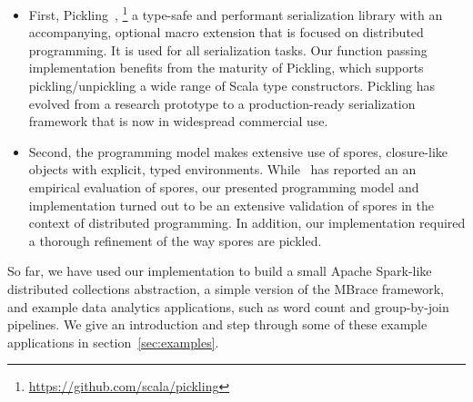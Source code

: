 \documentclass{jfp1}
\begin{document}
\begin{itemize}

  \item First, Pickling~\cite{Pickling},
    \footnote{\url{https://github.com/scala/pickling}} a type-safe and
    performant serialization library with an accompanying, optional macro
    extension that is focused on distributed programming. It is used for all
    serialization tasks. Our function passing implementation benefits from the
    maturity of Pickling, which supports pickling/unpickling a wide range of
    Scala type constructors. Pickling has evolved from a research prototype to a
    production-ready serialization framework that is now in widespread
    commercial use.

  \item Second, the programming model makes extensive use of spores,
    closure-like objects with explicit, typed environments. While~\cite{Spores}
    has reported an an empirical evaluation of spores, our presented programming
    model and implementation turned out to be an extensive validation of spores
    in the context of distributed programming. In addition, our implementation
    required a thorough refinement of the way spores are pickled.

\end{itemize}

So far, we have used our implementation to build a small Apache Spark-like
distributed collections abstraction, a simple version of the
MBrace framework, and example data analytics applications, such as
word count and group-by-join pipelines. We give an introduction and step through
some of these example applications in section~\ref{sec:examples}.



\end{document}
